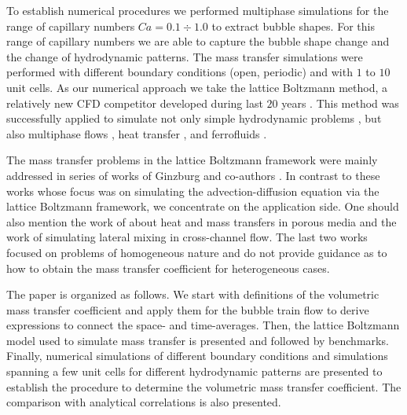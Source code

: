 \documentclass{article}
\begin{document}
To establish numerical procedures we performed multiphase simulations
\cite{kuzmin-binary2d,kuzmin-binary3d} for the range of capillary numbers
$Ca=0.1\div 1.0$ to extract bubble shapes. For this range of capillary numbers
we are able to capture the bubble shape change and the change of hydrodynamic
patterns. The mass transfer simulations were performed with different boundary
conditions (open, periodic) and with $1$ to $10$ unit cells.
As our numerical approach we take the lattice Boltzmann method, a relatively
new CFD competitor developed during last $20$ years
\cite{frisch,mcnamara,HJ,HSB}. This method was successfully applied to simulate
not only simple hydrodynamic problems \cite{yu}, but also multiphase
flows \cite{Shan-chen:extended,swift,gunstensen}, heat transfer
\cite{yuan-thermal,zhang-thermal}, and ferrofluids \cite{dellar-ferro,kuzmin-aniso}.

The mass transfer problems in the lattice Boltzmann framework were mainly
addressed in series of works of Ginzburg and co-authors
\cite{ginzburg-main,ginzburg-boundary-conditions,ginzburg-saturated-flow}.
In contrast to these works whose focus was on simulating the
advection-diffusion equation via the lattice Boltzmann framework, we concentrate
on the application side.  One should also mention the work of \citet{inamuro-scalar-boundary}
about heat and mass transfers in porous media and the work of
\citet{jos-mass} simulating lateral mixing in cross-channel flow.  The last two
works focused on problems of homogeneous nature and do not provide
guidance as to how to obtain the mass transfer coefficient for heterogeneous cases.

The paper is organized as follows. We start with definitions of the volumetric mass transfer coefficient and apply them 
for the bubble train flow to derive expressions to connect the space- and time-averages.  Then, the lattice
Boltzmann model used to simulate mass transfer is presented and followed by benchmarks. Finally,
numerical simulations of different boundary conditions and simulations spanning a few unit cells for
different hydrodynamic patterns are presented to establish the procedure to determine the
volumetric mass transfer coefficient. The comparison with analytical correlations is also presented.
\end{document}
